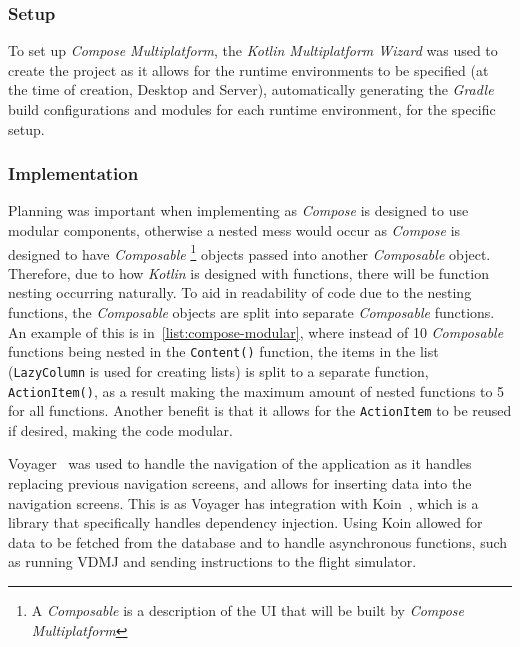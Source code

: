 \documentclass[../dissertation.tex]{subfiles}
\begin{document}
\subsubsection{Setup}
To set up \textit{Compose Multiplatform}, the \textit{Kotlin Multiplatform Wizard}
was used to create the project as it allows for the runtime environments to be
specified (at the time of creation, Desktop and Server), automatically generating
the \textit{Gradle} build configurations and modules for each runtime environment,
for the specific setup.

\subsubsection{Implementation}
Planning was important when implementing as \textit{Compose} is designed to use modular
components, otherwise a nested mess would occur as \textit{Compose} is designed to
have \textit{Composable}%
\footnote{A \textit{Composable} is a description of the UI that will be built by \textit{Compose Multiplatform}}
objects passed into another \textit{Composable} object.
Therefore, due to how \textit{Kotlin}
is designed with functions, there will be function nesting occurring naturally.
To aid in readability of code due to the nesting functions, the \textit{Composable} objects
are split into separate \textit{Composable} functions.
An example of this is in~\autoref{list:compose-modular}, where instead of
10 \textit{Composable} functions being nested in the \lstinline|Content()| function,
the items in the list (\lstinline|LazyColumn| is used for creating lists) is split
to a separate function, \lstinline|ActionItem()|, as a result making the maximum
amount of nested functions to 5 for all functions.
Another benefit is that it allows for the \lstinline|ActionItem| to be reused
if desired, making the code modular.

Voyager~\cite{voyager} was used to handle the navigation of the application as it
handles replacing previous navigation screens, and allows for inserting data
into the navigation screens.
This is as Voyager has integration with Koin~\cite{koin}\cite{voyager:koin}, which is
a library that specifically handles dependency injection.
Using Koin allowed for data to be fetched from the database and to handle asynchronous
functions, such as running VDMJ and sending instructions to the flight simulator.

\end{document}
